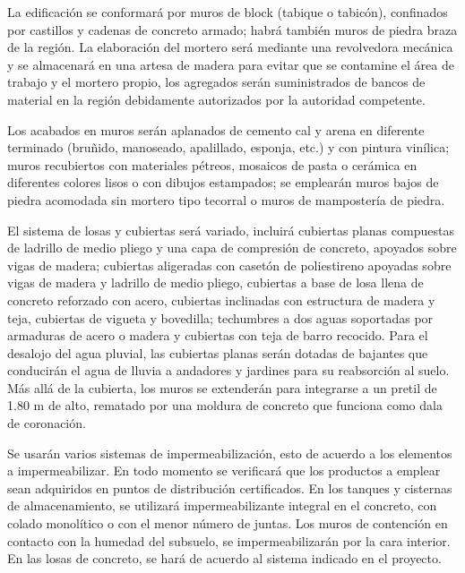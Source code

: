 \documentclass{article}
\begin{document}
\bigskip

La edificación se conformará por muros de block (tabique o tabicón), confinados por castillos y cadenas de concreto armado; habrá también muros de piedra braza de la región. La elaboración del mortero será mediante una revolvedora mecánica y se almacenará en una artesa de madera para evitar que se contamine el área de trabajo y el mortero propio, los agregados serán suministrados de bancos de material en la región debidamente autorizados por la autoridad competente. 


\bigskip

Los acabados en muros serán aplanados de cemento cal y arena en diferente terminado (bruñido, manoseado, apalillado, esponja, etc.) y con pintura vinílica; muros recubiertos con materiales pétreos, mosaicos de pasta o cerámica en diferentes colores lisos o con dibujos estampados; se emplearán muros bajos de piedra acomodada sin mortero tipo tecorral o muros de mampostería de piedra.


\bigskip

El sistema de losas y cubiertas será variado, incluirá cubiertas planas compuestas de ladrillo de medio pliego y una capa de compresión de concreto, apoyados sobre vigas de madera; cubiertas aligeradas con casetón de poliestireno apoyadas sobre vigas de madera y ladrillo de medio pliego, cubiertas a base de losa llena de concreto reforzado con acero, cubiertas inclinadas con estructura de madera y teja, cubiertas de vigueta y bovedilla; techumbres a dos aguas soportadas por armaduras de acero o madera y cubiertas con teja de barro recocido. Para el desalojo del agua pluvial, las cubiertas planas serán dotadas de bajantes que conducirán el agua de lluvia a andadores y jardines para su reabsorción al suelo. Más allá de la cubierta, los muros se extenderán para integrarse a un pretil de 1.80 m de alto, rematado por una moldura de concreto que funciona como dala de coronación. 


\bigskip

Se usarán varios sistemas de impermeabilización, esto de acuerdo a los elementos a impermeabilizar. En todo momento se verificará que los productos a emplear sean adquiridos en puntos de distribución certificados. En los tanques y cisternas de almacenamiento, se utilizará impermeabilizante integral en el concreto, con colado monolítico o con el menor número de juntas. Los muros de contención en contacto con la humedad del subsuelo, se impermeabilizarán por la cara interior. En las losas de concreto, se hará de acuerdo al sistema indicado en el proyecto.
\end{document}
